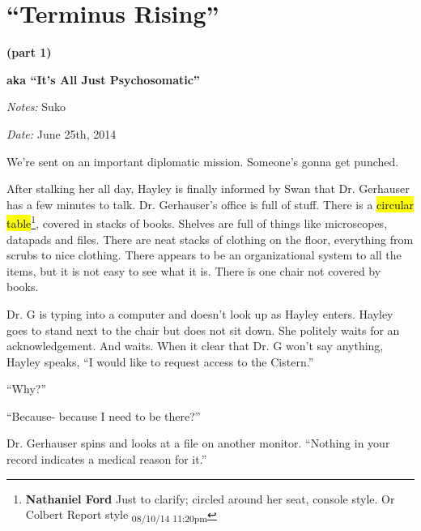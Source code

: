 \setcounter{chapter}{ 26 }
\chapter{\textbf{``Terminus Rising''} }




\begin{center}
 {\LARGE \textbf{(part 1)} } 
\end{center}


\begin{center}
 {\LARGE \textbf{aka ``It's All Just Psychosomatic''} } 
\end{center}




\textit{Notes:} Suko

\textit{Date:} June 25th, 2014



We're sent on an important diplomatic mission.  Someone's gonna get punched.



\noindent\hrulefill





After stalking her all day, Hayley is finally informed by Swan that Dr. Gerhauser has a few minutes to talk.  Dr. Gerhauser's office is full of stuff. There is a \hl{circular table}\footnote{\textbf{Nathaniel Ford }Just to clarify; circled around her seat, console style. Or Colbert Report style \textsubscript{08/10/14 11:20pm}}, covered in stacks of books.  Shelves are full of things like microscopes, datapads and files.  There are neat stacks of clothing on the floor, everything from scrubs to nice clothing.  There appears to be an organizational system to all the items, but it is not easy to see what it is.  There is one chair not covered by books.



Dr. G is typing into a computer and doesn't look up as Hayley enters.  Hayley goes to stand next to the chair but does not sit down.  She politely waits for an acknowledgement.  And waits.  When it clear that Dr. G won't say anything, Hayley speaks, ``I would like to request access to the Cistern.''

``Why?''

``Because- because I need to be there?''

Dr. Gerhauser spins and looks at a file on another monitor.  ``Nothing in your record indicates a medical reason for it.''


